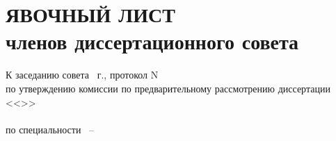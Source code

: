 

\section{ЯВОЧНЫЙ ЛИСТ\\
	 членов диссертационного совета }

\begin{center}
	К заседанию совета \underline{\hspace{2cm}}~\thesisYear г., протокол N~\underline{\hspace{2cm}} \\
	по утверждению комиссии по предварительному рассмотрению диссертации\\
	<<\thesisTitle>>\\
	  \textbf{\thesisAuthorLastNameFrom}\\ 
	по специальности \thesisSpecialtyNumber\ -- \thesisSpecialtyTitle\\
\end{center}





